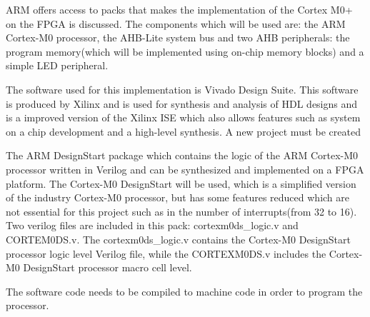 ARM offers access to packs that makes the implementation of the Cortex M0+ on the FPGA is discussed. The components which will be used are: the ARM Cortex-M0 processor, the AHB-Lite system bus and two AHB peripherals: the program memory(which will be implemented using on-chip memory blocks) and a simple LED peripheral.

The software used for this implementation is Vivado Design Suite. This software is produced by Xilinx and is used for synthesis and analysis of HDL designs and is a improved version of the Xilinx ISE which also allows features such as system on a chip development and a high-level synthesis. A new project must be created

The ARM DesignStart  package which contains the logic of the ARM Cortex-M0 processor written in Verilog and can be synthesized and implemented on a FPGA platform. The Cortex-M0 DesignStart will be used, which is a simplified version of the industry Cortex-M0 processor, but has some features reduced which are not essential for this project such as in the number of interrupts(from 32 to 16). Two verilog files are included in this pack:  cortexm0ds\_logic.v and CORTEM0DS.v. The cortexm0ds\_logic.v contains the Cortex-M0 DesignStart processor logic level Verilog file, while the CORTEXM0DS.v includes the Cortex-M0 DesignStart processor macro cell level.

The software code needs to be compiled to machine code in order to program the processor.
